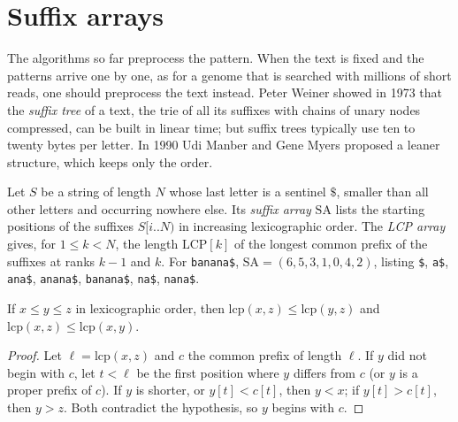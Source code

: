 \section{Suffix arrays}\label{sec:suffixarray}

The algorithms so far preprocess the pattern. When the text is fixed and the patterns arrive one by one, as for a genome that is searched with millions of short reads, one should preprocess the text instead. Peter Weiner showed in 1973 that the \emph{suffix tree} of a text, the trie of all its suffixes with chains of unary nodes compressed, can be built in linear time; but suffix trees typically use ten to twenty bytes per letter.
In 1990 Udi Manber and Gene Myers proposed a leaner structure, which keeps only the order.

Let $S$ be a string of length $N$ whose last letter is a sentinel $\$$, smaller than all other letters and occurring nowhere else. Its \emph{suffix array} $\mathrm{SA}$ lists the starting positions of the suffixes $S[i..N)$ in increasing lexicographic order. The \emph{LCP array} gives, for $1\le k<N$, the length $\mathrm{LCP}[k]$ of the longest common prefix of the suffixes at ranks $k-1$ and $k$. For \texttt{banana\$}, $\mathrm{SA}=(6,5,3,1,0,4,2)$, listing \texttt{\$}, \texttt{a\$}, \texttt{ana\$}, \texttt{anana\$}, \texttt{banana\$}, \texttt{na\$}, \texttt{nana\$}.

\begin{lemma}[sandwich]\label{lem:sandwich}
If $x\le y\le z$ in lexicographic order, then $\mathrm{lcp}(x,z)\le\mathrm{lcp}(y,z)$ and $\mathrm{lcp}(x,z)\le\mathrm{lcp}(x,y)$.
\end{lemma}
\begin{proof}
Let $\ell=\mathrm{lcp}(x,z)$ and $c$ the common prefix of length $\ell$. If $y$ did not begin with $c$, let $t<\ell$ be the first position where $y$ differs from $c$ (or $y$ is a proper prefix of $c$). If $y$ is shorter, or $y[t]<c[t]$, then $y<x$; if $y[t]>c[t]$, then $y>z$. Both contradict the hypothesis, so $y$ begins with $c$.
\end{proof}


